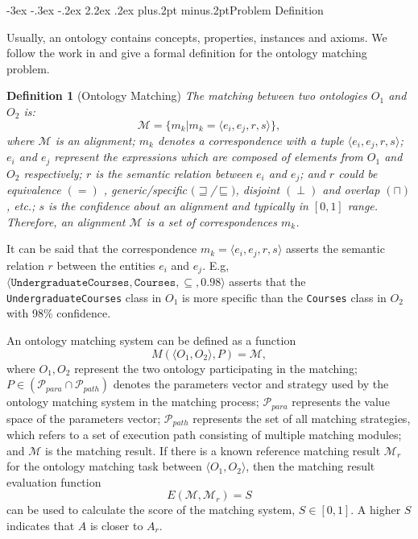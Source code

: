 \documentclass[twoside]{article}
\makeatletter
\def\section{\@startsection{section}{1}{\z@}%
 {-3ex \@plus -.3ex \@minus -.2ex}%
 {2.2ex \@plus.2ex}%
{\normalfont\normalsize\protect\baselineskip=14.5pt plus.2pt minus.2pt\bfseries}}
\makeatother
\begin{document}
\section{Problem Definition}

Usually, an ontology contains concepts, properties, instances and axioms.
We follow the work in\cite{Shvaiko2012, Euzenat2013} and give a formal definition for the ontology matching problem.


{\bf Definition 1} (Ontology Matching)
{\it
The matching between two ontologies $O_{1}$ and $O_{2}$ is:
$$\mathcal {M} =\{m_{k}|m_{k}=\langle e_{i},e_{j},r,s \rangle\},$$
where $\mathcal {M}$ is an alignment;
$m_{k}$ denotes a correspondence with a tuple $\langle e_{i},e_{j},r,s\rangle$;
$e_{i}$ and $e_{j}$ represent the expressions which are composed of elements from $O_{1}$ and $O_{2}$ respectively;
$r$ is the semantic relation between  $e_{i}$ and $e_{j}$;
and $r$ could be equivalence $(=)$ , generic/specific $(\sqsupseteq$/$\sqsubseteq)$, disjoint $(\perp)$ and overlap $(\sqcap)$, etc.;
$s$ is the confidence about an alignment and typically in $[0,1]$ range.
Therefore, an alignment $\mathcal {M}$ is a set of correspondences $m_{k}$.
}

It can be said that the correspondence $ m_{k}\!\!\!\!\!\!\!\!=\langle e_{i},e_{j},r,s\rangle$ asserts the semantic relation $ r $ between the entities $ {e_i} $ and $ {e_j} $.
E.g, $ \langle \texttt {UndergraduateCourses}, \texttt {Courses}, \subseteq , 0.98 \rangle $ asserts that the \texttt {UndergraduateCourses} class in $ {O_ {1}} $ is more specific than the \texttt {Courses} class in $ {O_ {2}} $ with 98\% confidence.

An ontology matching system can be defined as a function
$$ M (\langle O_1, O_2\rangle , P) = \mathcal {M}, $$
where $ O_1, O_2 $ represent the two ontology participating in the matching;
$ P \in (\mathcal{P}_{para} \cap \mathcal {P}_{path}) $ denotes the parameters vector and strategy used by the ontology matching system in the matching process;
$ \mathcal{P}_{para} $ represents the value space of the parameters vector;
$\mathcal{P}_{path}$ represents the set of all matching strategies, which refers to a set of execution path consisting of multiple matching modules;
and $ \mathcal {M} $ is the matching result.
If there is a known reference matching result $ \mathcal {M}_r $ for the ontology matching task between $ \langle O_1, O_2\rangle $,
then the matching result evaluation function
$$ E (\mathcal {M}, \mathcal {M}_r) = S $$
can be used to calculate the score of the matching system, $ S \in [0,1] $. A higher $S$ indicates that $ A $ is closer to $ A_r $.
\end{document}
